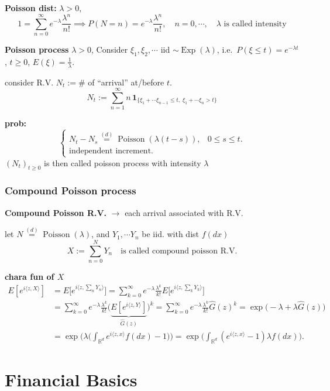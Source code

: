 \documentclass[
  letterpaper,
  DIV=11,
  numbers=noendperiod]{scrreprt}
\theoremstyle{definition}
\theoremstyle{plain}
\theoremstyle{plain}
\theoremstyle{definition}
\theoremstyle{plain}
\theoremstyle{plain}
\theoremstyle{remark}
\begin{document}
\textbf{Poisson dist:} \(\lambda > 0\), \[
1 = \sum_{n=0}^{\infty} e^{-\lambda} \frac{\lambda^n}{n!} \implies P(N = n) = e^{-\lambda} \frac{\lambda^n}{n!}, \quad n = 0, \cdots, \quad \lambda \text{ is called intensity}
\]

\textbf{Poisson process} \(\lambda > 0\), Consider
\(\xi_1, \xi_2, \cdots\) iid \(\sim \operatorname{Exp}(\lambda)\),
i.e.~\(P(\xi \leq t) = e^{-\lambda t}\), \(t \geq 0\),
\(E(\xi) = \tfrac1\lambda\).

consider R.V. \(N_t := \#\) of ``arrival'' at/before \(t\). \[
N_t := \sum_{n=1}^{\infty} n \, \mathbf{1}_{\{\xi_1 + \cdots \xi_{n-1} \leq t, \; \xi_1 + \cdots \xi_n > t\}}
\]

\textbf{prob:} \[
\begin{cases}
N_t - N_s \overset{(d)}{=} \operatorname{Poisson}(\lambda(t-s)), & 0 \leq s \leq t. \\
\text{independent increment.}
\end{cases}
\] \((N_t)_{t \geq 0}\) is then called poisson process with intensity
\(\lambda\)

\section{Compound Poisson process}\label{compound-poisson-process}

\textbf{Compound Poisson R.V.} \(\to\) each arrival associated with R.V.

let \(N \overset{(d)}{=} \operatorname{Poisson}(\lambda)\), and
\(Y_1, \cdots Y_n\) be iid. with dist \(f(dx)\) \[
X := \sum_{n=0}^{N} Y_n \quad \text{is called compound poisson R.V.}
\]

\textbf{chara fun of \(X\)} \[
\begin{aligned}
E[e^{i\langle z, X\rangle}] &= E\big[e^{i\langle z, \sum_n Y_n\rangle}\big] = \sum_{k=0}^{\infty} e^{-\lambda} \frac{\lambda^k}{k!} E\big[e^{i\langle z, \sum_k Y_k\rangle}\big] \\
&= \sum_{k=0}^{\infty} e^{-\lambda} \frac{\lambda^k}{k!} \big(\underbrace{E[e^{i\langle z, Y\rangle}]}_{\hat{G}(z)}\big)^k = \sum_{k=0}^{\infty} e^{-\lambda} \frac{\lambda^k}{k!} \hat{G}(z)^k = \exp\big(-\lambda + \lambda \hat{G}(z)\big) \\
&= \exp\Big(\lambda\big(\int_{\mathbb{R}^d} e^{i\langle z, x\rangle} f(dx) - 1\big)\Big) = \exp\Big(\int_{\mathbb{R}^d}(e^{i\langle z, x\rangle} - 1) \lambda f(dx)\Big).
\end{aligned}
\]

\part{Financial Basics}
\end{document}
